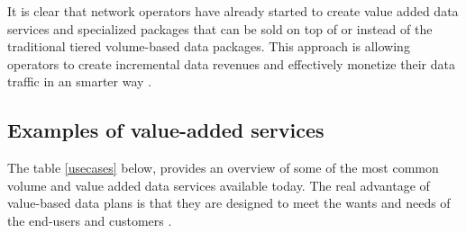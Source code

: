 It is clear that network operators have already started to create value added data services and specialized packages that can be sold on top of or instead of the traditional tiered volume-based data packages. This approach is allowing operators to create incremental data revenues and effectively monetize their data traffic in an smarter way \cite{Kimbler2012}.

\subsection{Examples of value-added services}
\noindent
The table \ref{usecases} below, provides an overview of some of the most common volume and value added data services available today. The real advantage of value-based data plans is that they are designed to meet the wants and needs of the end-users and customers \cite{Elitecore2012}.
